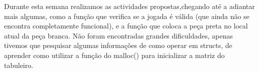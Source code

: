 Durante esta semana realizamos as actividades propostas,chegando até a adiantar mais algumas, como a função que verifica se a jogada é válida (que ainda não se encontra completamente funcional), e a função que coloca a peça preta no local atual da peça branca. Não foram encontradas grandes dificuldades, apenas tivemos que pesquisar algumas informações de como operar em structs, de aprender como utilizar a função do malloc() para inicializar a matriz do tabuleiro. 